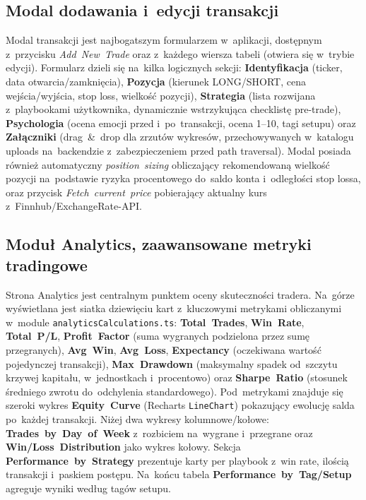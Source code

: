 \documentclass[12pt,a4paper]{article}
\begin{document}
\subsection*{Modal dodawania i~edycji transakcji}
Modal transakcji jest najbogatszym formularzem w~aplikacji, dostępnym z~przycisku \emph{Add~New~Trade} oraz z~każdego wiersza tabeli (otwiera się w~trybie edycji). Formularz dzieli się na~kilka logicznych sekcji: \textbf{Identyfikacja} (ticker, data otwarcia/zamknięcia), \textbf{Pozycja} (kierunek LONG/SHORT, cena wejścia/wyjścia, stop loss, wielkość pozycji), \textbf{Strategia} (lista rozwijana z~playbookami użytkownika, dynamicznie wstrzykująca checklistę pre-trade), \textbf{Psychologia} (ocena emocji przed i~po~transakcji, ocena 1--10, tagi setupu) oraz \textbf{Załączniki} (drag~\&~drop dla zrzutów wykresów, przechowywanych w~katalogu uploads na~backendzie z~zabezpieczeniem przed path traversal). Modal posiada również automatyczny \emph{position~sizing} obliczający rekomendowaną wielkość pozycji na~podstawie ryzyka procentowego do~saldo konta i~odległości stop lossa, oraz przycisk \emph{Fetch~current~price} pobierający aktualny kurs z~Finnhub/ExchangeRate-API.

\subsection*{Moduł Analytics, zaawansowane metryki tradingowe}
Strona Analytics jest centralnym punktem oceny skuteczności tradera. Na~górze wyświetlana jest siatka dziewięciu kart z~kluczowymi metrykami obliczanymi w~module \texttt{analyticsCalculations.ts}: \textbf{Total~Trades}, \textbf{Win~Rate}, \textbf{Total~P/L}, \textbf{Profit~Factor} (suma wygranych podzielona przez sumę przegranych), \textbf{Avg~Win}, \textbf{Avg~Loss}, \textbf{Expectancy} (oczekiwana wartość pojedynczej transakcji), \textbf{Max~Drawdown} (maksymalny spadek od~szczytu krzywej kapitału, w~jednostkach i~procentowo) oraz \textbf{Sharpe~Ratio} (stosunek średniego zwrotu do~odchylenia standardowego). Pod~metrykami znajduje się szeroki wykres \textbf{Equity~Curve} (Recharts \texttt{LineChart}) pokazujący ewolucję salda po~każdej transakcji. Niżej dwa wykresy kolumnowe/kołowe: \textbf{Trades~by~Day~of~Week} z~rozbiciem na~wygrane i~przegrane oraz \textbf{Win/Loss~Distribution} jako wykres kołowy. Sekcja \textbf{Performance~by~Strategy} prezentuje karty per playbook z~win rate, ilością transakcji i~paskiem postępu. Na~końcu tabela \textbf{Performance~by~Tag/Setup} agreguje wyniki według tagów setupu.
\end{document}
